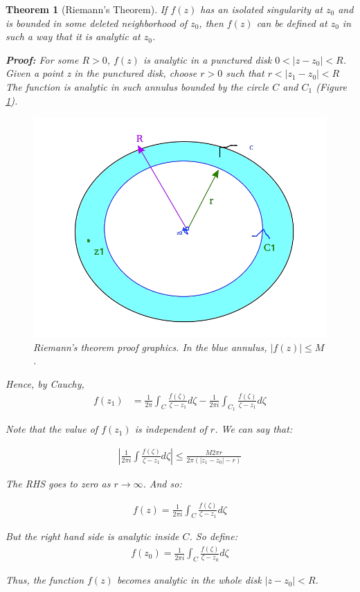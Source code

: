\documentclass{article}
\newtheorem{theorem}{Theorem}[section]
\theoremstyle{definition}
\begin{document}
\begin{theorem}[Riemann's Theorem]
	If $f(z)$ has an isolated singularity at $z_0$ and is bounded in some deleted neighborhood of $z_0$, then $f(z)$ can be defined at $z_0$ in such a way that it is analytic at $z_0$. 
	
	\textbf{Proof:} For some $R>0$, $f(z)$ is analytic in a punctured disk $0<|z-z_0|<R$. Given a point z in the punctured disk, choose $r>0$ such that $r < |z_1 - z_0|<R$ The function is analytic in such annulus bounded by the circle $C$ and $C_1$ (Figure \ref{fig:riemann}). 
	
	\begin{figure}[H]
		\centering
		\includegraphics[width=0.7\linewidth]{riemann}
		\caption{Riemann's theorem proof graphics. In the blue annulus, $|f(z)|\leq M$.}
		\label{fig:riemann}
	\end{figure}
	Hence, by Cauchy, 
	\begin{align*}
	f(z_1) &= \frac{1}{2\pi}\int_C \frac{f(\zeta)}{\zeta - z_1} d\zeta - \frac{1}{2\pi i}\int_{C_1} \frac{f(\zeta)}{\zeta - z_1} d\zeta
	\end{align*}
	
	Note that the value of $f(z_1)$ is independent of $r$. We can say that:
	
	\begin{align*}
	\left|\frac{1}{2\pi i }\int \frac{f(\zeta)}{\zeta - z_1} d\zeta\right| \leq \frac{M2\pi r}{2\pi (|z_1-z_0|-r)}
	\end{align*}
	
	The RHS goes to zero as $r \to \infty$. And so:
	
	\begin{align*}
	f(z) = \frac{1}{2\pi i }\int_C \frac{f(\zeta)}{\zeta - z_1} d\zeta
	\end{align*}
	
	But the right hand side is analytic inside $C$. So define:
	\begin{align*}
	f(z_0) = \frac{1}{2\pi i }\int_C \frac{f(\zeta)}{\zeta - z_0} d\zeta
	\end{align*}
	
	Thus, the function $f(z)$ becomes analytic in the whole disk $|z-z_0|<R$. 
	
\end{theorem}
\end{document}
